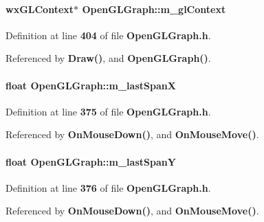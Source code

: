 \paragraph[{m\+\_\+gl\+Context}]{\setlength{\rightskip}{0pt plus 5cm}wx\+G\+L\+Context$\ast$ Open\+G\+L\+Graph\+::m\+\_\+gl\+Context\hspace{0.3cm}{\ttfamily [private]}}\label{classOpenGLGraph_af2bc5ce00693682b35ddda805feee72b}


Definition at line {\bf 404} of file {\bf Open\+G\+L\+Graph.\+h}.



Referenced by {\bf Draw()}, and {\bf Open\+G\+L\+Graph()}.

\paragraph[{m\+\_\+last\+SpanX}]{\setlength{\rightskip}{0pt plus 5cm}float Open\+G\+L\+Graph\+::m\+\_\+last\+SpanX\hspace{0.3cm}{\ttfamily [private]}}\label{classOpenGLGraph_a53eb0f120b0153ceb286f6ee4674ed2d}


Definition at line {\bf 375} of file {\bf Open\+G\+L\+Graph.\+h}.



Referenced by {\bf On\+Mouse\+Down()}, and {\bf On\+Mouse\+Move()}.

\paragraph[{m\+\_\+last\+SpanY}]{\setlength{\rightskip}{0pt plus 5cm}float Open\+G\+L\+Graph\+::m\+\_\+last\+SpanY\hspace{0.3cm}{\ttfamily [private]}}\label{classOpenGLGraph_a41a490dfdcee9d91d5f16f83cc170212}


Definition at line {\bf 376} of file {\bf Open\+G\+L\+Graph.\+h}.



Referenced by {\bf On\+Mouse\+Down()}, and {\bf On\+Mouse\+Move()}.

